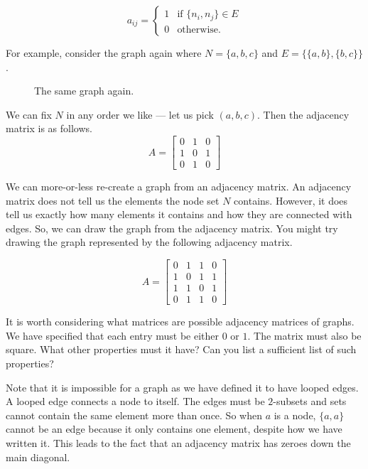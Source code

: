 \documentclass{iansnotes}
\begin{document}
  \[ a_{ij} = \begin{cases} 1 & \text{if } \{n_i, n_j\} \in E \\ 0 & \text{otherwise.} \end{cases}\]

  For example, consider the graph again where $N = \{a, b, c\}$ and $E = \{ \{a, b\}, \{b, c\} \}$.
  \begin{figure}
    \centering
    \caption{The same graph again.}
    \label{figure:thesamegraph}
  \end{figure}
  We can fix $N$ in any order we like --- let us pick $(a,b,c)$.
  Then the adjacency matrix is as follows.
  \[ A = \begin{bmatrix} 0 & 1 & 0 \\ 1 & 0 & 1 \\ 0 & 1 & 0 \end{bmatrix} \]
  
  We can more-or-less re-create a graph from an adjacency matrix.
  An adjacency matrix does not tell us the elements the node set $N$ contains.
  However, it does tell us exactly how many elements it contains and how they are connected with edges.
  So, we can draw the graph from the adjacency matrix.
  You might try drawing the graph represented by the following adjacency matrix.

  \[ A = \begin{bmatrix} 0 & 1 & 1 & 0 \\ 1 & 0 & 1 & 1 \\ 1 & 1 & 0 & 1 \\ 0 & 1 & 1 & 0 \end{bmatrix} \]

  It is worth considering what matrices are possible adjacency matrices of graphs.
  We have specified that each entry must be either $0$ or $1$.
  The matrix must also be square.
  What other properties must it have?
  Can you list a sufficient list of such properties?

  Note that it is impossible for a graph as we have defined it to have looped edges.
  A looped edge connects a node to itself.
  The edges must be $2$-subsets and sets cannot contain the same element more than once.
  So when $a$ is a node, $\{ a, a \}$ cannot be an edge because it only contains one element, despite how we have written it.
  This leads to the fact that an adjacency matrix has zeroes down the main diagonal.
    
\end{document}
